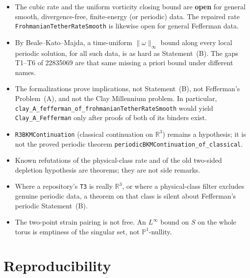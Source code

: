 \documentclass[11pt]{article}
\theoremstyle{plain}
\theoremstyle{definition}
\theoremstyle{remark}
\newcommand{\R}{\mathbb{R}}
\begin{document}
{\sloppy\begin{itemize}[leftmargin=1.4em]
\item The cubic rate and the uniform vorticity closing bound are \textbf{open} for general smooth, divergence-free, finite-energy (or periodic) data. The repaired rate \texttt{FrohmanianTether\allowbreak RateSmooth} is likewise open for general Fefferman data.
\item By Beale--Kato--Majda, a time-uniform \(\|\omega\|_{\infty}\) bound along every local periodic solution, for all such data, is as hard as Statement~(B). The gaps T1--T6 of 22835069 are that same missing a priori bound under different names.
\item The formalizations prove implications, not Statement~(B), not Fefferman's Problem~(A), and not the Clay Millennium problem. In particular, \texttt{clay\_\hspace{0pt}A\_\hspace{0pt}fefferman\_\hspace{0pt}of\_\hspace{0pt}frohmanianTether\allowbreak RateSmooth} would yield \texttt{Clay\_\hspace{0pt}A\_\hspace{0pt}Fefferman} only after proofs of both of its binders exist.
\item \texttt{R3BKMContinuation} (classical continuation on \(\R^{3}\)) remains a hypothesis; it is not the proved periodic theorem \texttt{periodicBKMContinuation\_\hspace{0pt}of\_\hspace{0pt}classical}.
\item Known refutations of the physical-class rate and of the old two-sided depletion hypothesis are theorems; they are not side remarks.
\item Where a repository's \texttt{T3} is really \(\R^{3}\), or where a physical-class filter excludes genuine periodic data, a theorem on that class is silent about Fefferman's periodic Statement~(B).
\item The two-point strain pairing is not free. An \(L^{\infty}\) bound on \(S\) on the whole torus is emptiness of the singular set, not \(\mathbb{P}^{1}\)-nullity.
\end{itemize}}

\section{Reproducibility}
\label{sec:repro}
\end{document}
